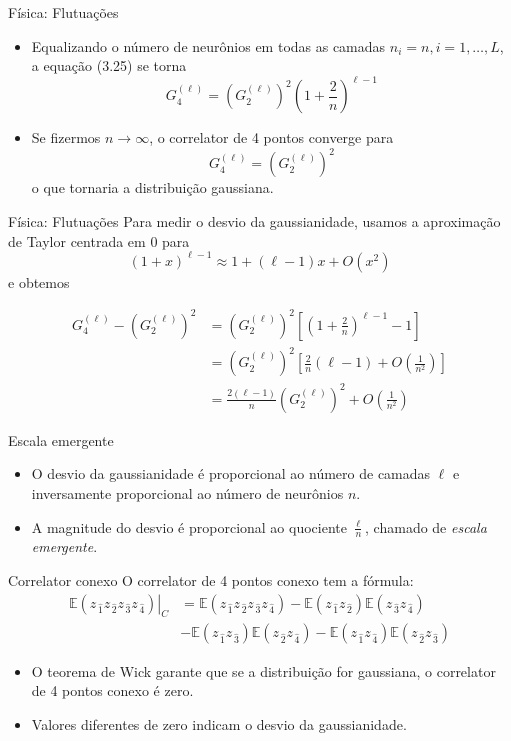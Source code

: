 \documentclass{beamer}
\newcommand{\EE}{\mathbb{E}}
\def\mi#1{{\,\widehat{#1}}}
\def\eell{{(\ell)}}
\begin{document}
\begin{frame}{Física: Flutuações}
	\begin{itemize}
		\item Equalizando o número de neurônios em todas as camadas $n_i = n, i=1,\ldots,L$, a equação (3.25) se torna
	\begin{equation*}\tag{3.25'}
		G_4^\eell = \left(G_2^\eell\right)^2\left(1 + \frac{2}{n}\right)^{\ell-1}
	\end{equation*}
	\item Se fizermos $n\to\infty$, o correlator de 4 pontos converge para
	\begin{equation*}
		G_4^\eell = \left(G_2^\eell\right)^2
	\end{equation*}
	o que tornaria a distribuição gaussiana.
\end{itemize}
\end{frame}

\begin{frame}{Física: Flutuações}
	Para medir o desvio da gaussianidade, usamos a aproximação de Taylor centrada em 0 para $$(1+x)^{\ell-1} \approx 1 + (\ell-1)x + O(x^2)$$ e obtemos

\begin{align*}\tag{3.28}
	G_4^\eell  - \left(G_2^\eell\right)^2 &=  \left(G_2^\eell\right)^2\left[\left(1 + \frac{2}{n}\right)^{\ell-1}-1\right] \\
	&= \left(G_2^\eell\right)^2\left[\frac{2}{n}(\ell-1) + O\left(\frac{1}{n^2}\right)\right] \\
	&= \frac{2(\ell-1)}{n}\left(G_2^\eell\right)^2 + O\left(\frac{1}{n^2}\right)
\end{align*}
\end{frame}

\begin{frame}{Escala emergente}
	\begin{itemize}
		\item O desvio da gaussianidade é proporcional ao número de camadas $\ell$ e inversamente proporcional ao número de neurônios $n$.
		\item A magnitude do desvio é proporcional ao quociente $\frac{\ell}{n}$, chamado de \textit{escala emergente}.
	\end{itemize}
\end{frame}

\begin{frame}{Correlator conexo}
	O correlator de 4 pontos conexo tem a fórmula:
\begin{align*}\tag{1.54}
	\left.\EE(z_{\mi1} z_{\mi2} z_{\mi3} z_{\mi4})\right|_C &= \EE(z_{\mi1} z_{\mi2} z_{\mi3} z_{\mi4}) - \EE(z_{\mi1} z_{\mi2})\EE(z_{\mi3} z_{\mi4}) \\
	& - \EE(z_{\mi1} z_{\mi3})\EE(z_{\mi2} z_{\mi4}) - \EE(z_{\mi1} z_{\mi4})\EE(z_{\mi2} z_{\mi3}) 
\end{align*}
\begin{itemize}
	\item O teorema de Wick garante que se a distribuição for gaussiana, o correlator de 4 pontos conexo é zero.
	\item Valores diferentes de zero indicam o desvio da gaussianidade.
\end{itemize}
\end{frame}
\end{document}

